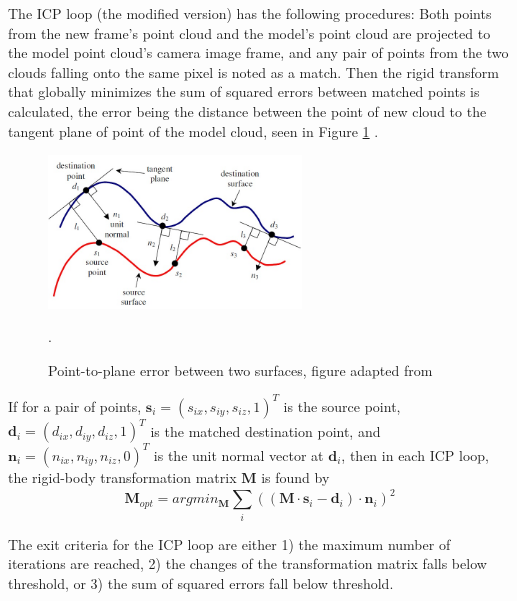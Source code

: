 \documentclass{ut-thesis}
\begin{document}
The ICP loop (the modified version) has the following procedures:  Both points from the new frame's point cloud and the model's point cloud are projected to the model point cloud's camera image frame, and any pair of points from the two clouds falling onto the same pixel is noted as a match.  Then the rigid transform that globally minimizes the sum of squared errors between matched points is calculated, the error being the distance between the point of new cloud to the tangent plane of point of the model cloud, seen in Figure \ref{fig:pointToPlaneError} \cite{low2004linear}.
\begin{figure} [h]
	\centering
	\includegraphics[width=0.6\textwidth]{./img/point_to_plane_error.jpg}
	\caption{Point-to-plane error between two surfaces, figure adapted from \cite{low2004linear}}.
	\label{fig:pointToPlaneError}
\end{figure}


If for a pair of points, \( \textbf{s}_i = (s_{ix}, s_{iy}, s_{iz}, 1)^T \) is the source point, \( \textbf{d}_i = (d_{ix}, d_{iy}, d_{iz}, 1)^T \) is the matched destination point, and \( \textbf{n}_i = (n_{ix}, n_{iy}, n_{iz}, 0)^T \) is the unit normal vector at \( \textbf{d}_i \), then in each ICP loop, the rigid-body transformation matrix \( \textbf{M} \) is found by
\[  \textbf{M}_{opt} = arg min_\textbf{M} \sum_{i}^{} ((\textbf{M} \cdot \textbf{s}_i - \textbf{d}_i) \cdot \textbf{n}_i)^2  \]

The exit criteria for the ICP loop are either 1) the maximum number of iterations are reached, 2) the changes of the transformation matrix falls below threshold, or 3) the sum of squared errors fall below threshold.
\end{document}
